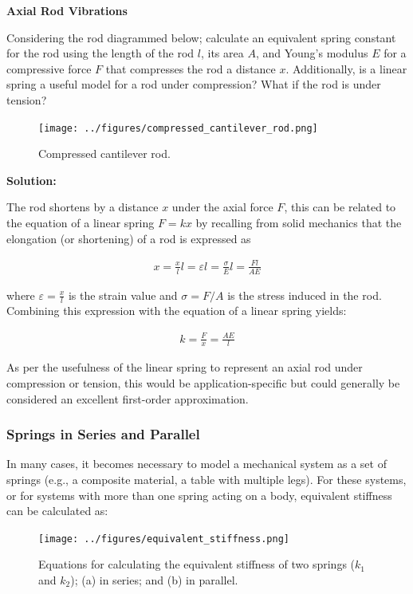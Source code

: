 \documentclass[12pt,letter]{article}
\begin{document}
			\begin{example}
    			
    		\textbf{Axial Rod Vibrations}

			\noindent	Considering the rod diagrammed below; calculate an equivalent spring constant for the rod using the length of the rod $l$, its area $A$, and Young's modulus $E$ for a compressive force $F$ that compresses the rod a distance $x$. Additionally, is a linear spring a useful model for a rod under compression? What if the rod is under tension?
        
		 		\begin{figure}[H]
		 			\centering
		 			\texttt{[image: ../figures/compressed\_cantilever\_rod.png]}
		 			\caption{Compressed cantilever rod. }
		 		\end{figure}	   
       
				\pagebreak
			    \noindent \textbf{Solution:}

				 The rod shortens by a distance $x$ under the axial force $F$, this can be related to the equation of a linear spring $F=kx$ by recalling from solid mechanics that the elongation (or shortening) of a rod is expressed as 
			
			    \begin{eqnarray}
			    x=\frac{x}{l}l=\varepsilon l = \frac{\sigma}{E}l = \frac{Fl}{AE}
			    \end{eqnarray}    
			    
			    where  $\varepsilon = \frac{x}{l}$ is the strain value and $\sigma = F/A$ is the stress induced in the rod. Combining this expression with the equation of a linear spring yields:
			    
			    \begin{eqnarray}
			    k = \frac{F}{x}= \frac{AE}{l}
			    \end{eqnarray}     
			   
			    As per the usefulness of the linear spring to represent an axial rod under compression or tension, this would be application-specific but could generally be considered an excellent first-order approximation.  
			
			\end{example}

		\subsubsection{Springs in Series and Parallel}
			
			In many cases, it becomes necessary to model a mechanical system as a set of springs (e.g., a composite material, a table with multiple legs).  For these systems, or for systems with more than one spring acting on a body, equivalent stiffness can be calculated as:
			\begin{figure}[H]
				\centering
				\texttt{[image: ../figures/equivalent\_stiffness.png]}
				\caption{Equations for calculating the equivalent stiffness of two springs ($k_1$ and $k_2$); (a) in series; and (b) in parallel.}
			\end{figure}	
\end{document}
